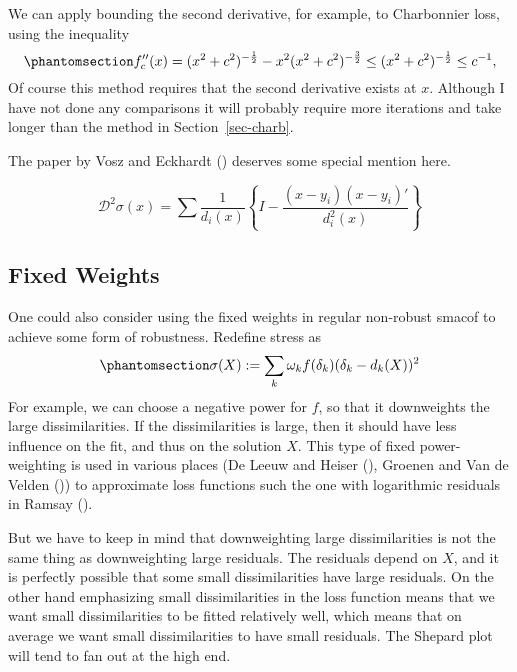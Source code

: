 \documentclass[
  12pt,
  letterpaper,
  DIV=11,
  numbers=noendperiod]{scrartcl}
\theoremstyle{definition}
\theoremstyle{plain}
\theoremstyle{plain}
\theoremstyle{remark}
\begin{document}
We can apply bounding the second derivative, for example, to Charbonnier
loss, using the inequality
\begin{equation}\phantomsection\label{eq-chark}{
f_c''(x)=(x^2 + c^2)^{-\frac12}-x^2(x^2 + c^2)^{-\frac32}\leq(x^2 + c^2)^{-\frac12}\leq c^{-1},
}\end{equation} Of course this method requires that the second
derivative exists at \(x\). Although I have not done any comparisons it
will probably require more iterations and take longer than the method in
Section~\ref{sec-charb}.

The paper by Vosz and Eckhardt ()
deserves some special mention here.

\[
\mathcal{D}^2\sigma(x)=\sum\frac{1}{d_i(x)}\left\{I-\frac{(x-y_i)(x-y_i)'}{d_i^2(x)}\right\}
\]

\subsection{Fixed Weights}\label{fixed-weights}

One could also consider using the fixed weights in regular non-robust
smacof to achieve some form of robustness. Redefine stress as
\begin{equation}\phantomsection\label{eq-wstress}{
\sigma(X):=\sum_k \omega_kf(\delta_k)(\delta_k-d_k(X))^2
}\end{equation} For example, we can choose a negative power for \(f\),
so that it downweights the large dissimilarities. If the dissimilarities
is large, then it should have less influence on the fit, and thus on the
solution \(X\). This type of fixed power-weighting is used in various
places (De Leeuw and Heiser (),
Groenen and Van de Velden ())
to approximate loss functions such the one with logarithmic residuals in
Ramsay ().

But we have to keep in mind that downweighting large dissimilarities is
not the same thing as downweighting large residuals. The residuals
depend on \(X\), and it is perfectly possible that some small
dissimilarities have large residuals. On the other hand emphasizing
small dissimilarities in the loss function means that we want small
dissimilarities to be fitted relatively well, which means that on
average we want small dissimilarities to have small residuals. The
Shepard plot will tend to fan out at the high end.
\end{document}
